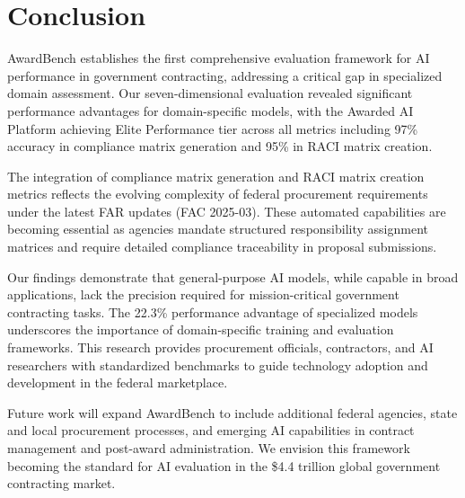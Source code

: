 \documentclass[11pt,a4paper]{article}
\begin{document}
\section{Conclusion}

AwardBench establishes the first comprehensive evaluation framework for AI performance in government contracting, addressing a critical gap in specialized domain assessment. Our seven-dimensional evaluation revealed significant performance advantages for domain-specific models, with the Awarded AI Platform achieving Elite Performance tier across all metrics including 97\% accuracy in compliance matrix generation and 95\% in RACI matrix creation.

The integration of compliance matrix generation and RACI matrix creation metrics reflects the evolving complexity of federal procurement requirements under the latest FAR updates (FAC 2025-03). These automated capabilities are becoming essential as agencies mandate structured responsibility assignment matrices and require detailed compliance traceability in proposal submissions.

Our findings demonstrate that general-purpose AI models, while capable in broad applications, lack the precision required for mission-critical government contracting tasks. The 22.3\% performance advantage of specialized models underscores the importance of domain-specific training and evaluation frameworks. This research provides procurement officials, contractors, and AI researchers with standardized benchmarks to guide technology adoption and development in the federal marketplace.

Future work will expand AwardBench to include additional federal agencies, state and local procurement processes, and emerging AI capabilities in contract management and post-award administration. We envision this framework becoming the standard for AI evaluation in the \$4.4 trillion global government contracting market.



\end{document}
